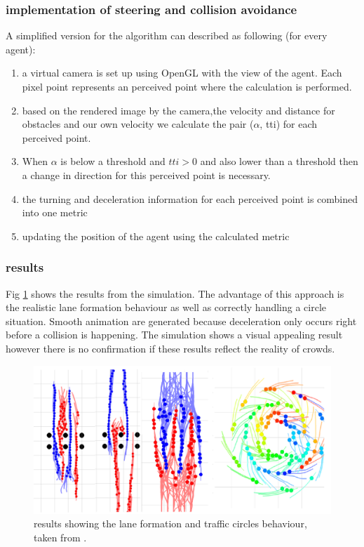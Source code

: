 \documentclass{acmsiggraph}               %
\begin{document}
\subsubsection{implementation of steering and collision avoidance} A simplified version for the algorithm can described as following (for every agent):
\begin{enumerate}
    \item a virtual camera is set up using OpenGL with the view of the agent. Each pixel point represents an perceived point where the calculation is performed. 
    \item based on the rendered image by the camera,the velocity and distance for obstacles and our own velocity we calculate the pair (\.{$\alpha$}, tti) for each perceived point.
    \item When \.{$\alpha$} is below a threshold and $tti > 0$ and also lower than a threshold then a change in direction for this perceived point is necessary. 
    \item the turning and deceleration information for each perceived point is combined into one metric 
    \item updating the position of the agent using the calculated metric
\end{enumerate}

\subsubsection{results}

Fig \ref{fig:visualResults} shows the results from the simulation. The advantage of this approach is the realistic lane formation behaviour as well as correctly handling a circle situation. Smooth animation are generated because deceleration only occurs right before a collision is happening. The simulation shows a visual appealing result however there is no confirmation if these results reflect the reality of crowds.

\begin{figure}[h]
  \centering
  \includegraphics[width=1\linewidth]{images/visualApproach-results.png}
  \caption{results showing the lane formation  and traffic circles behaviour, taken from \protect\cite{ondrej_synthetic-vision_2010}.}
  \label{fig:visualResults}
\end{figure}
\end{document}
